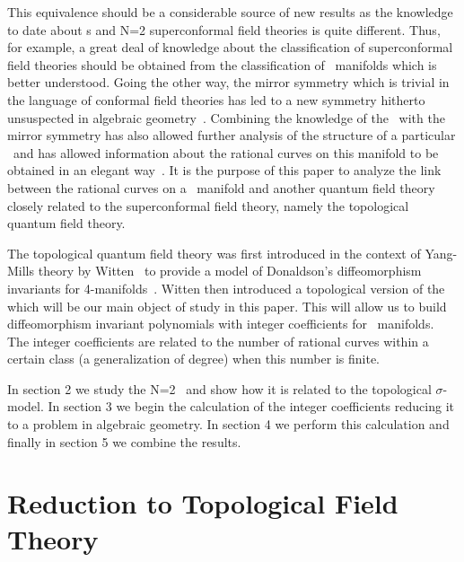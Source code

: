 This equivalence should be a considerable source of new results as the
knowledge to date about \nlsm s and N=2 superconformal field theories
is quite different. Thus, for example, a great deal of knowledge about
the classification of superconformal field theories should be obtained
from the classification of \CY\ manifolds which is better understood.
Going the other way, the mirror symmetry which is trivial in the
language of conformal field theories has led to a new symmetry
hitherto unsuspected in algebraic geometry~\cite{GP:mir,ALR:coup}.
Combining the knowledge of the \nlsm\ with the mirror symmetry has
also allowed further analysis of the structure of a particular
\CY\ and has allowed information about the rational curves on this manifold
to be obtained in an elegant way~\cite{Cand:rat}. It is the purpose of
this paper to analyze the link between the rational curves on a
\CY\ manifold and another quantum field theory closely related to the
superconformal field theory, namely the topological quantum field
theory.

The topological quantum field theory was first introduced in the context
of Yang-Mills theory by Witten~\cite{W:tqft} to provide a model of
Donaldson's diffeomorphism invariants for 4-manifolds~\cite{Don:,Don:poly}.
Witten then introduced a topological version of the
\nlsm~\cite{W:tsm} which will be our main object of study in this
paper. This will allow us to build diffeomorphism invariant
polynomials with integer coefficients for \CY\ manifolds. The integer
coefficients are related to the number of rational curves within a
certain class (a generalization of degree) when this number is finite.

In section 2 we study the N=2 \nlsm\ and show how it is related to the
topological $\sigma$-model. In section 3 we begin the calculation of
the integer coefficients reducing it to a problem in algebraic
geometry. In section 4 we perform this calculation and finally in
section 5 we combine the results.


\section{Reduction to Topological Field Theory}

